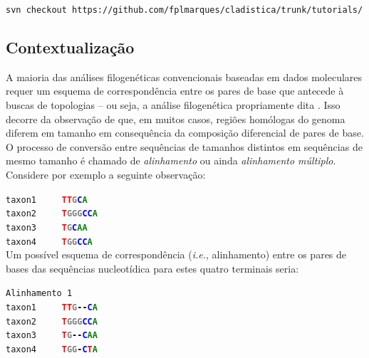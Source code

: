 \begin{center}
\small \texttt{svn checkout https://github.com/fplmarques/cladistica/trunk/tutorials/}\\
\end{center}


\newpage
\pagestyle{fancy} %
\begin{refsection}
\renewcommand*{\finalnamedelim}{\addspace\&\space} %
%
\newcommand{\A}{\textcolor{green}{\textbf{A}}}
\newcommand{\C}{\textcolor{blue}{\textbf{C}}}
\newcommand{\G}{\textcolor{gray}{\textbf{G}}}
\newcommand{\T}{\textcolor{red}{\textbf{T}}}
\newcommand{\gap}{\textcolor{black}{\textbf{-}}}


\section{Contextualização}\label{tut8:context}

A maioria das análises filogenéticas convencionais baseadas em dados moleculares requer um esquema de correspondência entre os pares de base que antecede à buscas de topologias -- ou seja, a análise filogenética propriamente dita \parencite{Wheeler_2012}. Isso decorre da observação de que, em muitos casos, regiões homólogas do genoma diferem em tamanho em consequência da composição diferencial de pares de base. O processo de conversão entre sequências de tamanhos distintos em sequências de mesmo tamanho é chamado de \textit{alinhamento} ou ainda \textit{alinhamento múltiplo}. Considere por exemplo a seguinte observação:


\indent\indent\indent\indent\indent\indent\indent\texttt{taxon1~~~~~\T\T\G\C\A}\\
\indent\indent\indent\indent\indent\indent\indent\texttt{taxon2~~~~~\T\G\G\G\C\C\A}\\
\indent\indent\indent\indent\indent\indent\indent\texttt{taxon3~~~~~\T\G\C\A\A}\\
\indent\indent\indent\indent\indent\indent\indent\texttt{taxon4~~~~~\T\G\G\C\C\A}\\

Um possível esquema de correspondência (\textit{i.e.}, alinhamento) entre os pares de bases das sequências nucleotídica para estes quatro terminais seria:

\texttt{Alinhamento 1}\\
\indent\indent\indent\indent\indent\indent\indent\texttt{taxon1~~~~~\T\T\G\gap\gap\C\A}\\
\indent\indent\indent\indent\indent\indent\indent\texttt{taxon2~~~~~\T\G\G\G\C\C\A}\\
\indent\indent\indent\indent\indent\indent\indent\texttt{taxon3~~~~~\T\G\gap\gap\C\A\A}\\
\indent\indent\indent\indent\indent\indent\indent\texttt{taxon4~~~~~\T\G\G\gap\C\T\A}\\


\end{refsection}
